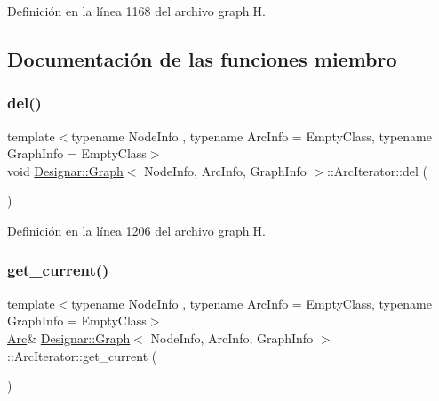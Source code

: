 Definición en la línea 1168 del archivo graph.\+H.



\subsection{Documentación de las funciones miembro}
\mbox{\label{class_designar_1_1_graph_1_1_arc_iterator_a6375bb0513856b2b20dffbfb2496082e}} 
\subsubsection{\texorpdfstring{del()}{del()}}
{\footnotesize\ttfamily template$<$typename Node\+Info , typename Arc\+Info  = Empty\+Class, typename Graph\+Info  = Empty\+Class$>$ \\
void \hyperlink{class_designar_1_1_graph}{Designar\+::\+Graph}$<$ Node\+Info, Arc\+Info, Graph\+Info $>$\+::Arc\+Iterator\+::del (\begin{DoxyParamCaption}{ }\end{DoxyParamCaption})\hspace{0.3cm}{\ttfamily [inline]}}



Definición en la línea 1206 del archivo graph.\+H.

\mbox{\label{class_designar_1_1_graph_1_1_arc_iterator_a4915ccaef38293e9dc449e7dba3965ec}} 
\subsubsection{\texorpdfstring{get\+\_\+current()}{get\_current()}\hspace{0.1cm}{\footnotesize\ttfamily [1/2]}}
{\footnotesize\ttfamily template$<$typename Node\+Info , typename Arc\+Info  = Empty\+Class, typename Graph\+Info  = Empty\+Class$>$ \\
\hyperlink{class_designar_1_1_graph_a74c730ef4ce2d20f998d72bd25c2b5bf}{Arc}\& \hyperlink{class_designar_1_1_graph}{Designar\+::\+Graph}$<$ Node\+Info, Arc\+Info, Graph\+Info $>$\+::Arc\+Iterator\+::get\+\_\+current (\begin{DoxyParamCaption}{ }\end{DoxyParamCaption})\hspace{0.3cm}{\ttfamily [inline]}}



